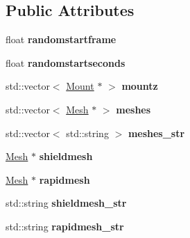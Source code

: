 \subsection*{Public Attributes}
\begin{DoxyCompactItemize}
\item 
float {\bfseries randomstartframe}\hypertarget{structUnit_1_1XML_a8457bb9b5a121bdec7e330efb2f9a649}{}\label{structUnit_1_1XML_a8457bb9b5a121bdec7e330efb2f9a649}

\item 
float {\bfseries randomstartseconds}\hypertarget{structUnit_1_1XML_a1fa65df7142082184c1672b7c1e9d356}{}\label{structUnit_1_1XML_a1fa65df7142082184c1672b7c1e9d356}

\item 
std\+::vector$<$ \hyperlink{classMount}{Mount} $\ast$ $>$ {\bfseries mountz}\hypertarget{structUnit_1_1XML_a176ec62b18bd517ea66806965e52d116}{}\label{structUnit_1_1XML_a176ec62b18bd517ea66806965e52d116}

\item 
std\+::vector$<$ \hyperlink{classMesh}{Mesh} $\ast$ $>$ {\bfseries meshes}\hypertarget{structUnit_1_1XML_a134527279761cb5a659e0e26ee5cb0c9}{}\label{structUnit_1_1XML_a134527279761cb5a659e0e26ee5cb0c9}

\item 
std\+::vector$<$ std\+::string $>$ {\bfseries meshes\+\_\+str}\hypertarget{structUnit_1_1XML_a42873de062fba433f765041b834b35f4}{}\label{structUnit_1_1XML_a42873de062fba433f765041b834b35f4}

\item 
\hyperlink{classMesh}{Mesh} $\ast$ {\bfseries shieldmesh}\hypertarget{structUnit_1_1XML_a5b017315fa95f8c339c28ef72bd36e0f}{}\label{structUnit_1_1XML_a5b017315fa95f8c339c28ef72bd36e0f}

\item 
\hyperlink{classMesh}{Mesh} $\ast$ {\bfseries rapidmesh}\hypertarget{structUnit_1_1XML_a4084074b2419f1db9ae22ff4c2b65047}{}\label{structUnit_1_1XML_a4084074b2419f1db9ae22ff4c2b65047}

\item 
std\+::string {\bfseries shieldmesh\+\_\+str}\hypertarget{structUnit_1_1XML_a84a07fc2c8f410d564173d5b0872ce46}{}\label{structUnit_1_1XML_a84a07fc2c8f410d564173d5b0872ce46}

\item 
std\+::string {\bfseries rapidmesh\+\_\+str}\hypertarget{structUnit_1_1XML_ad254a7f45703f4ac31a31712f85a5eb5}{}\label{structUnit_1_1XML_ad254a7f45703f4ac31a31712f85a5eb5}


\end{DoxyCompactItemize}
